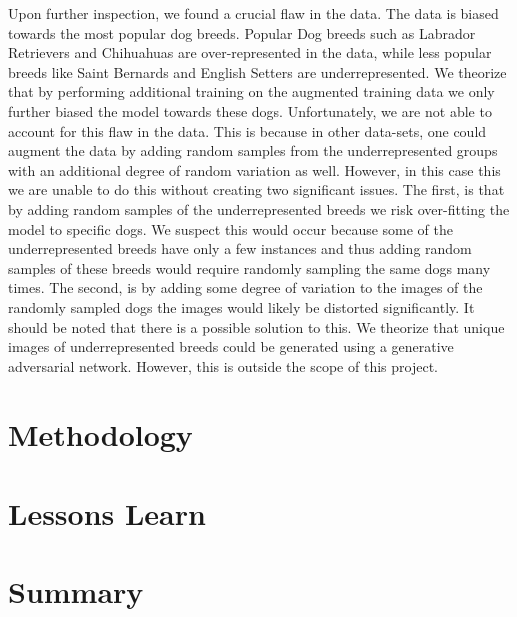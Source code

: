\documentclass{article}
\begin{document}
Upon further inspection, we found a crucial flaw in the data.  The data is biased towards the most popular dog breeds.  Popular Dog breeds such as Labrador Retrievers and Chihuahuas are over-represented in the data, while less popular breeds like Saint Bernards and English Setters are underrepresented.  We theorize that by performing additional training on the augmented training data we only further biased the model towards these dogs.  Unfortunately, we are not able to account for this flaw in the data.  This is because in other data-sets, one could augment the data by adding random samples from the underrepresented groups with an additional degree of random variation as well.  However, in this case this we are unable to do this without creating two significant issues.  The first, is that by adding random samples of the underrepresented breeds we risk over-fitting the model to specific dogs.  We suspect this would occur because some of the underrepresented breeds have only a few instances and thus adding random samples of these breeds would require randomly sampling the same dogs many times.  The second, is by adding some degree of variation to the images of the randomly sampled dogs the images would likely be distorted significantly.  It should be noted that there is a possible solution to this.  We theorize that unique images of underrepresented breeds could be generated using a generative adversarial network.  However, this is outside the scope of this project.

\section{Methodology}

\section{Lessons Learn}

\section{Summary}
\end{document}
